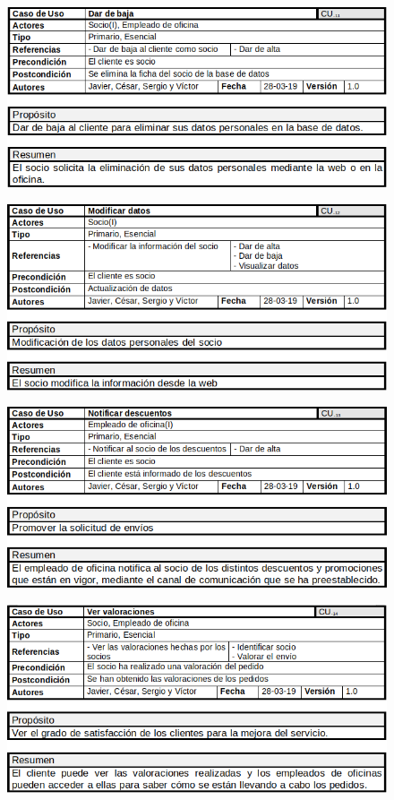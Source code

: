 \begin{figure}[H]
	\centering
	\includegraphics[width=16cm]{11}
\end{figure}
\begin{figure}[H]
	\centering
	\includegraphics[width=16cm]{12}
\end{figure}
\begin{figure}[H]
	\centering
	\includegraphics[width=16cm]{13}
\end{figure}
\begin{figure}[H]
	\centering
	\includegraphics[width=16cm]{14}
\end{figure}
